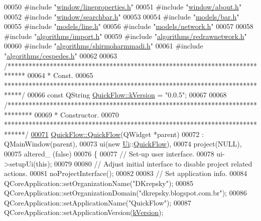 \begin{DoxyCode}
00050 \textcolor{preprocessor}{#include "\hyperlink{lineproperties_8h}{window/lineproperties.h}"}
00051 \textcolor{preprocessor}{#include "\hyperlink{about_8h}{window/about.h}"}
00052 \textcolor{preprocessor}{#include "\hyperlink{searchbar_8h}{window/searchbar.h}"}
00053 
00054 \textcolor{preprocessor}{#include "\hyperlink{bar_8h}{models/bar.h}"}
00055 \textcolor{preprocessor}{#include "\hyperlink{line_8h}{models/line.h}"}
00056 \textcolor{preprocessor}{#include "\hyperlink{network_8h}{models/network.h}"}
00057 
00058 \textcolor{preprocessor}{#include "\hyperlink{import_8h}{algorithms/import.h}"}
00059 \textcolor{preprocessor}{#include "\hyperlink{redrawnetwork_8h}{algorithms/redrawnetwork.h}"}
00060 \textcolor{preprocessor}{#include "\hyperlink{shirmoharmmadi_8h}{algorithms/shirmoharmmadi.h}"}
00061 \textcolor{preprocessor}{#include "\hyperlink{cespedes_8h}{algorithms/cespedes.h}"}
00062 
00063 \textcolor{comment}{/*****************************************************************************}
00064 \textcolor{comment}{* Const.}
00065 \textcolor{comment}{*****************************************************************************/}
00066 \textcolor{keyword}{const} QString \hyperlink{group___window_gabfc3b1280bdae9a9c046d56b1459ab99}{QuickFlow::kVersion} = \textcolor{stringliteral}{"0.0.5"};
00067 
00068 \textcolor{comment}{/*******************************************************************************}
00069 \textcolor{comment}{ * Constructor.}
00070 \textcolor{comment}{ ******************************************************************************/}
\hypertarget{quickflow_8cpp_source_l00071}{}\hyperlink{group___window_ga7689e2608835392fce3f4c95a7a542db}{00071} \hyperlink{group___window_ga7689e2608835392fce3f4c95a7a542db}{QuickFlow::QuickFlow}(QWidget *parent)
00072   : QMainWindow(parent),
00073     ui(new \hyperlink{namespace_ui}{Ui}::\hyperlink{class_quick_flow}{QuickFlow}),
00074     project(NULL),
00075     altered\_ (false)
00076 \{
00077   \textcolor{comment}{// Set-up user interface.}
00078   ui->setupUi(\textcolor{keyword}{this});
00079 
00080   \textcolor{comment}{// Adjust initial interface to disable project related actions.}
00081   noProjectInterface();
00082 
00083   \textcolor{comment}{// Set application info.}
00084   QCoreApplication::setOrganizationName(\textcolor{stringliteral}{"DKrepsky"});
00085   QCoreApplication::setOrganizationDomain(\textcolor{stringliteral}{"dkrepsky.blogspot.com.br"});
00086   QCoreApplication::setApplicationName(\textcolor{stringliteral}{"QuickFlow"});
00087   QCoreApplication::setApplicationVersion(\hyperlink{group___window_gabfc3b1280bdae9a9c046d56b1459ab99}{kVersion});

\end{DoxyCode}
